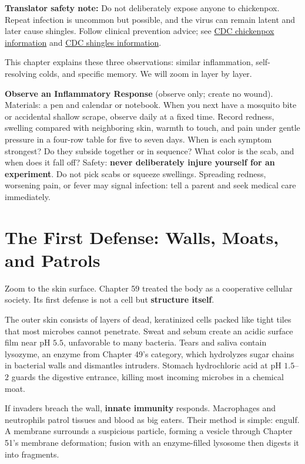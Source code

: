 \textbf{Translator safety note:} Do not deliberately expose anyone to chickenpox. Repeat infection is uncommon but possible, and the virus can remain latent and later cause shingles. Follow clinical prevention advice; see \href{https://www.cdc.gov/chickenpox/about/index.html}{CDC chickenpox information} and \href{https://www.cdc.gov/shingles/hcp/clinical-overview/index.html}{CDC shingles information}.

This chapter explains these three observations: similar inflammation, self-resolving colds, and specific memory. We will zoom in layer by layer.

\begin{shiyan}
\textbf{Observe an Inflammatory Response} (observe only; create no wound). Materials: a pen and calendar or notebook. When you next have a mosquito bite or accidental shallow scrape, observe daily at a fixed time. Record redness, swelling compared with neighboring skin, warmth to touch, and pain under gentle pressure in a four-row table for five to seven days. When is each symptom strongest? Do they subside together or in sequence? What color is the scab, and when does it fall off? Safety: \textbf{never deliberately injure yourself for an experiment}. Do not pick scabs or squeeze swellings. Spreading redness, worsening pain, or fever may signal infection: tell a parent and seek medical care immediately.
\end{shiyan}

\section{The First Defense: Walls, Moats, and Patrols}

Zoom to the skin surface. Chapter 59 treated the body as a cooperative cellular society. Its first defense is not a cell but \textbf{structure itself}.

The outer skin consists of layers of dead, keratinized cells packed like tight tiles that most microbes cannot penetrate. Sweat and sebum create an acidic surface film near pH $5.5$, unfavorable to many bacteria. Tears and saliva contain lysozyme, an enzyme from Chapter 49's category, which hydrolyzes sugar chains in bacterial walls and dismantles intruders. Stomach hydrochloric acid at pH $1.5$--$2$ guards the digestive entrance, killing most incoming microbes in a chemical moat.

If invaders breach the wall, \textbf{innate immunity} responds. Macrophages and neutrophils patrol tissues and blood as big eaters. Their method is simple: engulf. A membrane surrounds a suspicious particle, forming a vesicle through Chapter 51's membrane deformation; fusion with an enzyme-filled lysosome then digests it into fragments.

